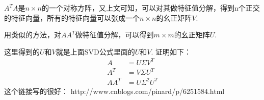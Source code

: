 \documentclass[]{article}
\begin{document}
$ A^T A $是$ n\times n $的一个对称方阵，又上文可知，可以对其做特征值分解，得到n个正交的特征向量，所有的特征向量可以张成一个$ n\times n $的幺正矩阵$V$.

用类似的方法，对$ AA^T $做特征值分解，可以得到$ m\times m $的幺正矩阵$U$.

这里得到的$ U $和$ V $就是上面SVD公式里面的$ U $和$ V $. 证明如下：
\[ 
\begin{aligned}
A     &= U\Sigma V^T \\
A^T   &= V\Sigma U^T \\
AA^T  &= U\Sigma^2 U^T
\end{aligned}
 \]
这个链接写的很好：
http://www.cnblogs.com/pinard/p/6251584.html
\end{document}
